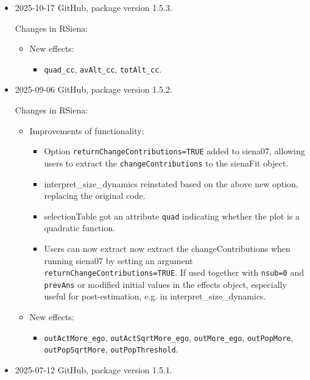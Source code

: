 \documentclass[a4paper,fleqn,11pt]{article}
\newcommand{\+}{\, + \,}
\newcommand{\sfn}[1]{\textsf{#1}}
\begin{document}
\begin{small}
\begin{itemize}
\item 2025-10-17 GitHub, package version 1.5.3.

Changes in RSiena:
\begin{itemize}
\item New effects:
   \begin{itemize}
    \item \texttt{quad\_cc}, \texttt{avAlt\_cc}, \texttt{totAlt\_cc}.
    \end{itemize}
\end{itemize}


\item 2025-09-06 GitHub, package version 1.5.2.

Changes in RSiena:
\begin{itemize}
\item Improvements of functionality:
   \begin{itemize}
    \item Option \texttt{returnChangeContributions=TRUE} added to
        \sfn{siena07}, allowing users to extract the
        \texttt{changeContributions} to the \sfn{sienaFit} object.
    \item \sfn{interpret\_size\_dynamics} reinstated based on the above new option,
        replacing the original code.
  \item \sfn{selectionTable} got an attribute \texttt{quad} indicating
    whether the plot is a quadratic function.
  \item Users can now extract now extract the changeContributions when running
    \sfn{siena07} by setting an argument \texttt{returnChangeContributions=TRUE}.
    If used together with \texttt{nsub=0} and \texttt{prevAns} or modified initial
    values in the effects object, especially useful for post-estimation,
    e.g. in \sfn{interpret\_size\_dynamics}.
    \end{itemize}
\item New effects:
   \begin{itemize}
    \item \texttt{outActMore\_ego}, \texttt{outActSqrtMore\_ego}, \texttt{outMore\_ego},
        \texttt{outPopMore}, \\
        \texttt{outPopSqrtMore}, \texttt{outPopThreshold}.
    \end{itemize}
\end{itemize}


\item 2025-07-12 GitHub, package version 1.5.1.


\end{itemize}
\end{small}
\end{document}
